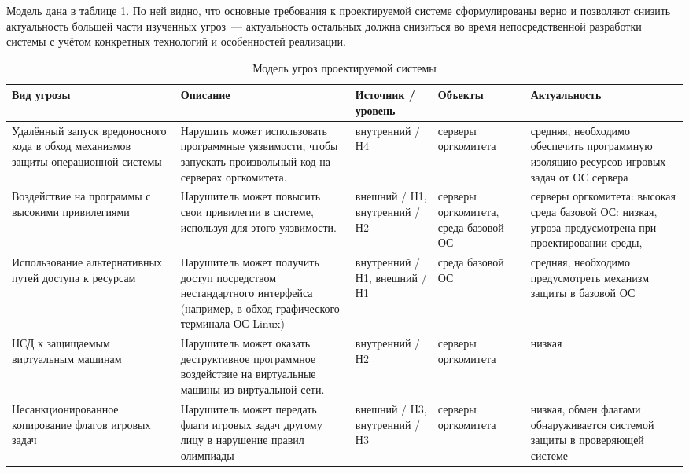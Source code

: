 Модель дана в таблице \ref{tab:model}. По ней видно, что основные требования к проектируемой системе сформулированы верно и позволяют снизить актуальность большей части изученных угроз~--- актуальность остальных должна снизиться во время непосредственной разработки системы с учётом конкретных технологий и особенностей реализации.

\begin{landscape}
  \begin{longtable}{|p{5cm}|p{9cm}|p{3cm}|p{2.5cm}|p{5cm}|}
    \caption{Модель угроз проектируемой системы}
    \label{tab:model}
    \\ \hline
    \textbf{Вид угрозы} & \textbf{Описание} & \textbf{Источник / уровень} & \textbf{Объекты} & \textbf{Актуальность}
    \\ \hline \endhead

    Удалённый запуск вредоносного кода в обход механизмов защиты операционной системы &
    Нарушить может использовать программные уязвимости, чтобы запускать произвольный код на серверах оргкомитета. &
    внутренний / Н4 &
    серверы оргкомитета &
    средняя, необходимо обеспечить программную изоляцию ресурсов игровых задач от ОС сервера
    \\ \hline

    Воздействие на программы с высокими привилегиями &
    Нарушитель может повысить свои привилегии в системе, используя для этого уязвимости. &
    внешний / Н1, внутренний / Н2 &
    серверы оргкомитета, среда базовой ОС &
    серверы оргкомитета: высокая
    среда базовой ОС: низкая, угроза предусмотрена при проектировании среды,
    \\ \hline

    Использование альтернативных путей доступа к ресурсам &
    Нарушитель может получить доступ посредством нестандартного интерфейса (например, в обход графического терминала ОС Linux)&
    внутренний / Н1, внешний / Н1 &
    среда базовой ОС &
    средняя, необходимо предусмотреть механизм защиты в базовой ОС
    \\ \hline

    НСД к защищаемым виртуальным машинам &
    Нарушитель может оказать деструктивное программное воздействие на виртуальные машины из виртуальной сети. &
    внутренний / Н2 &
    серверы оргкомитета &
    низкая
    \\ \hline

    Несанкционированное копирование флагов игровых задач &
    Нарушитель может передать флаги игровых задач другому лицу в нарушение правил олимпиады &
    внешний / Н3, внутренний / Н3 &
    серверы оргкомитета &
    низкая, обмен флагами обнаруживается системой защиты в проверяющей системе
    \\ \hline


\end{longtable}
\end{landscape}
